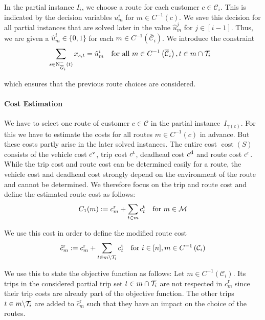 In the partial instance $I_i$, we choose a route for each customer $c\in\mathcal{C}_i$. This is indicated by the decision variables $u^i_m$ for ${m\in C^{-1}(c)}$. We save this decision for all partial instances that are solved later in the value $\hat{u}^j_m$ for ${j\in[i-1]}$. Thus, we are given a ${\hat{u}^i_m\in\{0,1\}}$ for each ${m\in C^{-1}\left(\overline{\mathcal{C}}_i\right)}$. We introduce the constraint
\begin{align}
	&\sum_{s\in\operatorname{N}_{\overline{G}_i}^-(t)} x_{s,t} = \hat{u}^i_m && \text{for all } m\in C^{-1}\left(\overline{\mathcal{C}}_i\right), t\in m\cap\mathcal{T}_i \label{eq:TMILP:route_fix}
\end{align}

which ensures that the previous route choices are considered.

\paragraph{Cost Estimation} \parfill

We have to select one route of customer ${c\in\mathcal{C}}$ in the partial instance~$I_{\gamma(c)}$. For this we have to estimate the costs for all routes $m\in C^{-1}(c)$ in advance. But these costs partly arise in the later solved instances. The entire cost $\operatorname{cost}(S)$ consists of the vehicle cost $c^{\operatorname{v}}$, trip cost $c^{\operatorname{t}}$, deadhead cost $c^{\operatorname{d}}$ and route cost $c^{\operatorname{r}}$. While the trip cost and route cost can be determined easily for a route, the vehicle cost and deadhead cost strongly depend on the environment of the route and cannot be determined. We therefore focus on the trip and route cost and define the estimated route cost as follows:
\begin{align*}
	C_1(m) := c^{\operatorname{r}}_m + \sum_{t\in m}c^{\operatorname{t}}_t && \text{for } m\in\mathcal{M}
\end{align*}

We use this cost in order to define the modified route cost
\begin{align*}
	\hat{c}^{\operatorname{r}}_m := c^{\operatorname{r}}_m + \sum_{t\in m\backslash\mathcal{T}_i}c^{\operatorname{t}}_t && \text{for } i\in[n], m\in C^{-1}\left(\mathcal{C}_i\right)
\end{align*}

We use this to state the objective function as follows: Let ${m\in C^{-1}\left(\mathcal{C}_i\right)}$. Its trips in the considered partial trip set ${t\in m\cap\mathcal{T}_i}$ are not respected in $\hat{c}^{\operatorname{r}}_m$ since their trip costs are already part of the objective function. The other trips ${t\in m\backslash\mathcal{T}_i}$ are added to $\hat{c}^{\operatorname{r}}_m$ such that they have an impact on the choice of the routes.

